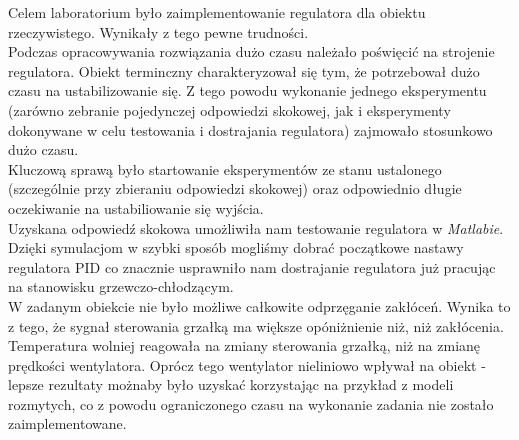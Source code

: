 \documentclass[12pt, a4paper]{article}
\begin{document}
Celem laboratorium było zaimplementowanie regulatora dla obiektu rzeczywistego. Wynikały z tego pewne trudności. \\
Podczas opracowywania rozwiązania dużo czasu należało poświęcić na strojenie regulatora. Obiekt terminczny charakteryzował się tym, że potrzebował dużo czasu na ustabilizowanie się. Z tego powodu wykonanie jednego eksperymentu (zarówno zebranie pojedynczej odpowiedzi skokowej, jak i eksperymenty dokonywane w celu testowania i dostrajania regulatora) zajmowało stosunkowo dużo czasu. \\
Kluczową sprawą było startowanie eksperymentów ze stanu ustalonego (szczególnie przy zbieraniu odpowiedzi skokowej) oraz odpowiednio długie oczekiwanie na ustabiliowanie się wyjścia.\\
Uzyskana odpowiedź skokowa umożliwiła nam testowanie regulatora w \textit{Matlabie}. Dzięki symulacjom w szybki sposób mogliśmy dobrać początkowe nastawy regulatora PID co znacznie usprawniło nam dostrajanie regulatora już pracując na stanowisku grzewczo-chłodzącym.\\
W zadanym obiekcie nie było możliwe całkowite odprzęganie zakłóceń. Wynika to z tego, że sygnał sterowania grzałką ma większe opóniżnienie niż, niż zakłócenia. Temperatura wolniej reagowała na zmiany sterowania grzałką, niż na zmianę  prędkości wentylatora. Oprócz tego wentylator nieliniowo wpływał na obiekt - lepsze rezultaty możnaby było uzyskać korzystając na przykład z modeli rozmytych, co z powodu ograniczonego czasu na wykonanie zadania nie zostało zaimplementowane.\\
\end{document}
